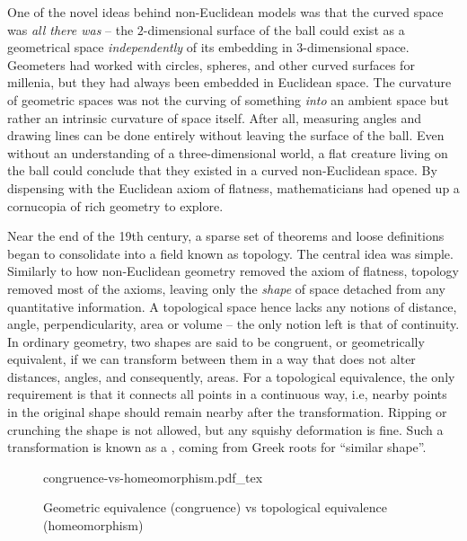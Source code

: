 One of the novel ideas behind non-Euclidean models was that the curved space was \emph{all there was} -- the $2$-dimensional surface of the ball could exist as a geometrical space \emph{independently} of its embedding in $3$-dimensional space.
Geometers had worked with circles, spheres, and other curved surfaces for millenia, but they had always been embedded in Euclidean space.
The curvature of geometric spaces was not the curving of something \emph{into} an ambient space but rather an intrinsic curvature of space itself. After all, measuring angles and drawing lines can be done entirely without leaving the surface of the ball. Even without an understanding of a three-dimensional world, a flat creature living on the ball could conclude that they existed in a curved non-Euclidean space.
By dispensing with the Euclidean axiom of flatness, mathematicians had opened up a cornucopia of rich geometry to explore.
%

Near the end of the 19th century, a sparse set of theorems and loose definitions began to consolidate into a field known as topology. The central idea was simple. Similarly to how non-Euclidean geometry removed the axiom of flatness, topology removed most of the axioms, leaving only the \emph{shape} of space detached from any quantitative information.
A topological space hence lacks any notions of distance, angle, perpendicularity, area or volume -- the only notion left is that of continuity.
In ordinary geometry, two shapes are said to be congruent, or geometrically equivalent, if we can transform between them in a way that does not alter distances, angles, and consequently, areas.
For a topological equivalence, the only requirement is that it connects all points in a continuous way, i.e, nearby points in the original shape should remain nearby after the transformation. Ripping or crunching the shape is not allowed, but any squishy deformation is fine. Such a transformation is known as a , coming from Greek roots for ``similar shape''.
\begin{figure}[ht]
	\centering
	{congruence-vs-homeomorphism.pdf_tex}
	\caption{Geometric equivalence (congruence) vs topological equivalence (homeomorphism)}\label{fig:first}
\end{figure}

